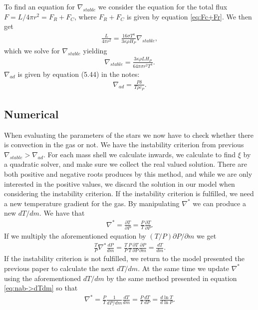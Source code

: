 \documentclass[a4paper,10pt]{article}
\begin{document}
To find an equation for $\nabla_{stable}$ we consider the equation for the total flux $F = L/4\pi r^2 = F_R + F_C$, where $F_R + F_C$ is given by equation \eqref{eq:Fc+Fr}. We then get
%
\begin{align*}
\frac{L}{4\pi r^2} = \frac{16\sigma T^4}{3\kappa \rho H_P}\nabla_{stable},
\end{align*}
%
which we solve for $\nabla_{stable}$ yielding
%
\begin{align}\label{nab_stab}
\nabla_{stable} = \frac{3\kappa \rho LH_P}{64\pi \sigma r^2 T^4}.
\end{align}
%
$\nabla_{ad}$ is given by equation (5.44) in the notes:
%
\begin{align}\label{eq:nab_ad}
\nabla_{ad} = \frac{P\delta}{T\rho c_P}.
\end{align}
%

\subsection{Numerical}
When evaluating the parameters of the stars we now have to check whether there is convection in the gas or not. We have the instability criterion from previous $\nabla_{stable} > \nabla_{ad}$. For each mass shell we calculate inwards, we calculate to find $\xi$ by a quadratic solver, and make sure we collect the real valued solution. There are both positive and negative roots produces by this method, and while we are only interested in the positive values, we discard the solution in our model when considering the instability criterion. If the instability criterion is fulfilled, we need a new temperature gradient for the gas. By manipulating $\nabla^*$ we can produce a new $dT/dm$. We have that 
%
\begin{align*}
\nabla^* = \frac{\partial T}{\partial P} = \frac{P}{T}\frac{\partial T}{\partial P}.
\end{align*}
%
If we multiply the aforementioned equation by $(T/P) \partial P/\partial m$ we get
%
\begin{align}\label{eq:nab->dTdm}
\frac{T}{P}\nabla^* \frac{dP}{dm} = \frac{T}{P}\frac{P}{T}\frac{\partial T}{\partial P}\frac{\partial P}{\partial m} = \frac{dT}{dm}.
\end{align}
%
If the instability criterion is not fulfilled, we return to the model presented the previous paper to calculate the next $dT/dm$. At the same time we update $\nabla^*$ using the aforementioned $dT/dm$ by the same method presented in equation \eqref{eq:nab->dTdm} so that
%
\begin{align}
\nabla^* = \frac{P}{T}\frac{1}{dP/dm}\frac{dT}{dm} = \frac{P}{T}\frac{dT}{dP} = \frac{d\ln T}{d\ln P}.
\end{align}
%
\end{document}
